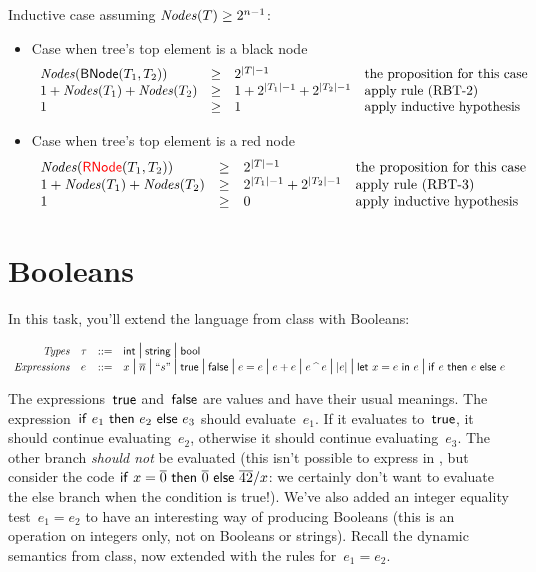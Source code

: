 \documentclass{article}
\begin{document}
Inductive case assuming $\mathit{Nodes}(T) \geq 2^{n-1}$:
\begin{itemize}
    \item Case when tree's top element is a black node
        \[
        \begin{array}{l l l l}
            \mathit{Nodes}(\mathsf{BNode}(T_1, T_2)) & \geq & 2^{|T|-1} & \text{the proposition for this case}\\
            1 + \mathit{Nodes}(T_1) + \mathit{Nodes}(T_2) & \geq & 1 + 2 ^ {|T_1| - 1} + 2 ^ {|T_2| - 1} & \text{apply rule (RBT-2)}\\
            1 & \geq & 1  & \text{apply inductive hypothesis}\\
        \end{array}
        \]
    
    \item Case when tree's top element is a red node
        \[
        \begin{array}{l l l l}
            \mathit{Nodes}({\color{red}{\mathsf{RNode}}}(T_1, T_2)) & \geq & 2^{|T|-1} & \text{the proposition for this case}\\
            1 + \mathit{Nodes}(T_1) + \mathit{Nodes}(T_2) & \geq & 2 ^ {|T_1| - 1} + 2 ^ {|T_2| - 1} & \text{apply rule (RBT-3)}\\
            1 & \geq & 0  & \text{apply inductive hypothesis}\\
        \end{array}
        \]
\end{itemize}

\section{Booleans}

In this task, you'll extend the {\Elang} language from class with Booleans:

\[
\begin{array}{r l l l}
  \mathit{Types} & \tau & \mathop{::=} &
  \mathsf{int} \mbox{\Large $\,\mid\,$} \mathsf{string} \mbox{\Large $\,\mid\,$} \mathsf{bool}\\
  \mathit{Expressions} & e & \mathop{::=} &
  x \mbox{\Large $\,\mid\,$}
  \overline{n} \mbox{\Large $\,\mid\,$}
  \text{``}s\text{''} \mbox{\Large $\,\mid\,$}
  \mathsf{true} \mbox{\Large $\,\mid\,$}
  \mathsf{false} \mbox{\Large $\,\mid\,$}
  e = e \mbox{\Large $\,\mid\,$}
  e + e \mbox{\Large $\,\mid\,$}
  e \mathbin{\text{\textasciicircum}} e \mbox{\Large $\,\mid\,$}
  |e| \mbox{\Large $\,\mid\,$}
  \mathsf{let}~x=e~\mathsf{in}~e \mbox{\Large $\,\mid\,$}
  \mathsf{if}~e~\mathsf{then}~e~\mathsf{else}~e
\end{array}
\]

The expressions~$\mathsf{true}$ and~$\mathsf{false}$ are values and have their usual
meanings.
%
The expression~$\mathsf{if}~e_1~\mathsf{then}~e_2~\mathsf{else}~e_3$ should evaluate~$e_1$. If it evaluates
to~$\mathsf{true}$, it should continue evaluating~$e_2$, otherwise it should
continue evaluating~$e_3$.
%
The other branch {\em should not} be evaluated (this isn't possible to express
in {\Elang}, but consider the code $\mathsf{if}~x = \overline{0}~\mathsf{then}~\overline{0}~\mathsf{else}~\overline{42} / x$: we certainly
don't want to evaluate the else branch when the condition is true!).
%
We've also added an integer equality test~$e_1 = e_2$ to have an interesting
way of producing Booleans (this is an operation on integers only, not on
Booleans or strings).
%
Recall the dynamic semantics from class, now extended with the rules
for~$e_1 = e_2$.
\end{document}

